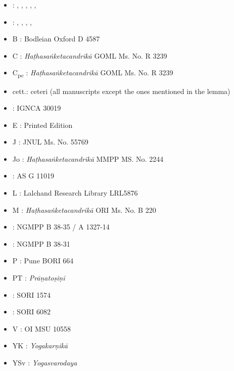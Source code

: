 \begin{itemize}
\item \beta : , , , , , 
\item \gamma : , , , , 
\item B : Bodleian Oxford D 4587
\item C : \emph{Haṭhasaṅketacandrikā} GOML Ms. No. R 3239
\item C\textsubscript{pc} : \emph{Haṭhasaṅketacandrikā} GOML Ms. No. R 3239
\item cett.: ceteri (all manuscripts except the ones mentioned in the lemma)
\item \Done : IGNCA 30019
\item E : Printed Edition
\item J : JNUL Ms. No. 55769
\item Jo : \emph{Haṭhasaṅketacandrikā} MMPP MS. No. 2244
\item \Kone : AS G 11019
\item L : Lalchand Research Library LRL5876
\item M : \emph{Haṭhasaṅketacandrikā} ORI Ms. No. B 220
\item \Ntwo : NGMPP B 38-35 / A 1327-14
\item \None : NGMPP B 38-31
\item P : Pune BORI 664
\item PT : \emph{Prāṇatoṣiṇī}
\item \Uone : SORI 1574
\item \Utwo : SORI 6082
\item V : OI MSU 10558
\item YK : \emph{Yogakarṇikā}%
\item YSv : \emph{Yogasvarodaya}
\end{itemize}
\newpage

